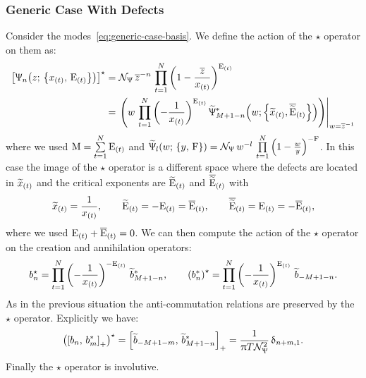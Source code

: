 \subsubsection{Generic Case With Defects}

Consider the modes~\eqref{eq:generic-case-basis}.
We define the action of the $\star$ operator on them as:
\begin{equation}
  \begin{split}
    \qty[ \Psi_{n}\qty( z;\, \qty{x_{(t)},\, \rE_{(t)}} ) ]^{\star}
    & =
    \cN_{\Psi}\,
    \barz^{-n}\,
    \finiteprod{t}{1}{N} \qty( 1 - \frac{\barz}{x_{(t)}} )^{\rE_{(t)}}
    \\
    & =
    \eval{ \qty(
    w \, \finiteprod{t}{1}{N} \qty( - \frac{1}{x_{(t)}} )^{\rE_{(t)}} \,
    \widetilde{\Psi}_{M + 1 - n}^*
    \qty(w; \qty{\tildex_{(t)}, \overline{\trE}_{(t)}})
    ) }_{w = \barz^{-1}}
  \end{split}
\end{equation}
where we used $\mathrm{M} = \sum\limits_{t = 1}^{N} \mathrm{E}_{(t)}$ and $\widetilde{\Uppsi}_l( w;\, \qty{ y,\, \ensuremath{\mathrm{F}}} ) = \mathcal{N}_{\Uppsi}\, w^{-l}\, \prod\limits_{t = 1}^{N} \qty( 1 - \frac{w}{y} )^{-\mathrm{F}}$.
In this case the image of the $\star$ operator is a different space where the defects are located in $\widetilde{x}_{(t)}$ and the critical exponents are $\widetilde{\mathrm{E}}_{(t)}$ and $\overline{\widetilde{\mathrm{E}}}_{(t)}$ with
\begin{equation}
  \widetilde{x}_{(t)} = \frac{1}{x_{(t)}},
  \qquad
  \widetilde{\mathrm{E}}_{(t)} = -\mathrm{E}_{(t)} = \overline{\mathrm{E}}_{(t)},
  \qquad
  \overline{\widetilde{\mathrm{E}}}_{(t)} = \mathrm{E}_{(t)} = - \overline{\mathrm{E}}_{(t)},
\end{equation}
where we used $\mathrm{E}_{(t)} + \overline{\mathrm{E}}_{(t)} = 0$.
We can then compute the action of the $\star$ operator on the creation and annihilation operators:
\begin{equation}
  b_n^{\star}
  =
  \prod\limits_{t = 1}^{N}
  \qty( - \frac{1}{x_{(t)}} )^{-\mathrm{E}_{(t)}}~
  \widetilde{b}^*_{M + 1- n},
  \qquad
  \qty(b_n^*)^{\star}
  =
  \prod\limits_{t = 1}^{N}
  \qty( - \frac{1}{x_{(t)}} )^{\mathrm{E}_{(t)}}~
  \widetilde{b}_{-M + 1- n}.
\end{equation}
As in the previous situation the anti-commutation relations are preserved by the $\star$ operator.
Explicitly we have:
\begin{equation}
  \qty( \left[ b_n,\, b_m^* \right]_+ )^{\star}
  =
  \left[ \widetilde{b}_{-M + 1 - m},\, \widetilde{b}_{M + 1 - n}^* \right]_+
  =
  \frac{1}{\uppi T \mathcal{N}_{\Uppsi}^2}\,
  \updelta_{n + m, 1}.
\end{equation}
Finally the $\star$ operator is involutive.


